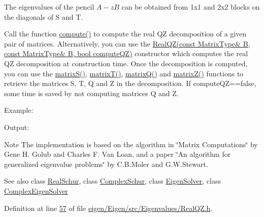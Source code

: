 The eigenvalues of the pencil $ A - z B $ can be obtained from 1x1 and 2x2 blocks on the diagonals of S and T.

Call the function \hyperlink{group___eigenvalues___module_a2b6847964d9f1903193cc3e67c196849}{compute()} to compute the real QZ decomposition of a given pair of matrices. Alternatively, you can use the \hyperlink{group___eigenvalues___module_ac6e41c839f8dae31c9a3906ea7540119}{Real\+Q\+Z(const Matrix\+Type\& B, const Matrix\+Type\& B, bool compute\+Q\+Z)} constructor which computes the real QZ decomposition at construction time. Once the decomposition is computed, you can use the \hyperlink{group___eigenvalues___module_ad24d7bf534afb55adaef00f00846adaf}{matrix\+S()}, \hyperlink{group___eigenvalues___module_a8dc963d8ea2a17df9d8d718e9e34d06f}{matrix\+T()}, \hyperlink{group___eigenvalues___module_a212bc2f69ea4eff830fde70e209e40fb}{matrix\+Q()} and \hyperlink{group___eigenvalues___module_a19a116383f11423179b4d8f316da6f67}{matrix\+Z()} functions to retrieve the matrices S, T, Q and Z in the decomposition. If compute\+QZ==false, some time is saved by not computing matrices Q and Z.

Example\+: 
\begin{DoxyCodeInclude}
\end{DoxyCodeInclude}
 Output\+: 
\begin{DoxyCodeInclude}
\end{DoxyCodeInclude}


\begin{DoxyNote}{Note}
The implementation is based on the algorithm in \char`\"{}\+Matrix Computations\char`\"{} by Gene H. Golub and Charles F. Van Loan, and a paper \char`\"{}\+An algorithm for
generalized eigenvalue problems\char`\"{} by C.\+B.\+Moler and G.\+W.\+Stewart.
\end{DoxyNote}
\begin{DoxySeeAlso}{See also}
class \hyperlink{group___eigenvalues___module_class_eigen_1_1_real_schur}{Real\+Schur}, class \hyperlink{group___eigenvalues___module_class_eigen_1_1_complex_schur}{Complex\+Schur}, class \hyperlink{group___eigenvalues___module_class_eigen_1_1_eigen_solver}{Eigen\+Solver}, class \hyperlink{group___eigenvalues___module_class_eigen_1_1_complex_eigen_solver}{Complex\+Eigen\+Solver} 
\end{DoxySeeAlso}


Definition at line \hyperlink{eigen_2_eigen_2src_2_eigenvalues_2_real_q_z_8h_source_l00057}{57} of file \hyperlink{eigen_2_eigen_2src_2_eigenvalues_2_real_q_z_8h_source}{eigen/\+Eigen/src/\+Eigenvalues/\+Real\+Q\+Z.\+h}.

